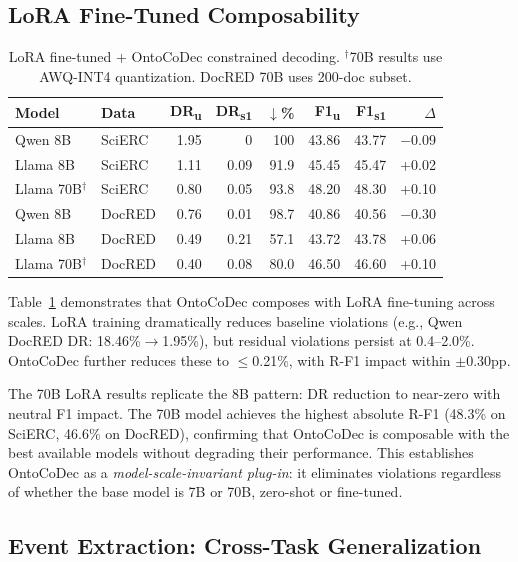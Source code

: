 \documentclass[11pt]{article}
\newcommand{\sys}{OntoCoDec}
\begin{document}
\subsection{LoRA Fine-Tuned Composability}
\label{sec:lora}

\begin{table}[t]
\centering
\caption{LoRA fine-tuned + \sys{} constrained decoding. $^\dagger$70B results use AWQ-INT4 quantization. DocRED 70B uses 200-doc subset.}
\label{tab:lora}
\small
\begin{tabular}{ll rrr rr r}
\toprule
\textbf{Model} & \textbf{Data} & \textbf{DR\textsubscript{u}} & \textbf{DR\textsubscript{s1}} & \textbf{$\downarrow$\%} & \textbf{F1\textsubscript{u}} & \textbf{F1\textsubscript{s1}} & \textbf{$\Delta$} \\
\midrule
Qwen 8B & SciERC & 1.95 & 0 & 100 & 43.86 & 43.77 & $-$0.09 \\
Llama 8B & SciERC & 1.11 & 0.09 & 91.9 & 45.45 & 45.47 & +0.02 \\
Llama 70B$^\dagger$ & SciERC & 0.80 & 0.05 & 93.8 & 48.20 & 48.30 & +0.10 \\
\midrule
Qwen 8B & DocRED & 0.76 & 0.01 & 98.7 & 40.86 & 40.56 & $-$0.30 \\
Llama 8B & DocRED & 0.49 & 0.21 & 57.1 & 43.72 & 43.78 & +0.06 \\
Llama 70B$^\dagger$ & DocRED & 0.40 & 0.08 & 80.0 & 46.50 & 46.60 & +0.10 \\
\bottomrule
\end{tabular}
\end{table}

Table~\ref{tab:lora} demonstrates that \sys{} composes with LoRA fine-tuning across scales.
LoRA training dramatically reduces baseline violations (e.g., Qwen DocRED DR: 18.46\%$\to$1.95\%), but residual violations persist at 0.4--2.0\%.
\sys{} further reduces these to $\leq$0.21\%, with R-F1 impact within $\pm$0.30pp.

The 70B LoRA results replicate the 8B pattern: DR reduction to near-zero with neutral F1 impact.
The 70B model achieves the highest absolute R-F1 (48.3\% on SciERC, 46.6\% on DocRED), confirming that \sys{} is composable with the best available models without degrading their performance.
This establishes \sys{} as a \emph{model-scale-invariant plug-in}: it eliminates violations regardless of whether the base model is 7B or 70B, zero-shot or fine-tuned.

\subsection{Event Extraction: Cross-Task Generalization}
\label{sec:ee}
\end{document}
